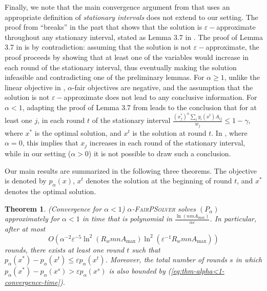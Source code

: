 \documentclass[11pt]{article}
\makeatletter
\newcommand{\wratio}{R_w}
\newtheorem{theorem}{Theorem}[section]
\renewcommand{\paragraph}{\@startsection{paragraph}{4}{\z@}{1ex \@plus 1ex \@minus .2ex}{-.5em}{\normalfont\normalsize\bfseries}}
\makeatother
\begin{document}
{Finally, we note that the main convergence argument from \cite{AwerbuchKhandekar2009} that uses an appropriate definition of \emph{stationary intervals} does not extend to our setting. The proof from \cite{AwerbuchKhandekar2009} ``breaks'' in the part that shows that the solution is $\varepsilon-$approximate throughout any stationary interval, stated as Lemma 3.7 in \cite{AwerbuchKhandekar2009}. The proof of Lemma 3.7 in \cite{AwerbuchKhandekar2009} is by contradiction: assuming that the solution is not $\varepsilon-$approximate, the proof proceeds by showing that at least one of the variables would increase in each round of the stationary interval, thus eventually making the solution infeasible and contradicting one of the preliminary lemmas. For $\alpha\geq 1$, unlike the linear objective in \cite{AwerbuchKhandekar2009}, $\alpha$-fair objectives are negative, and the assumption that the solution is not $\varepsilon-$approximate does not lead to any conclusive information. For $\alpha<1$, adapting the proof of Lemma 3.7 from \cite{AwerbuchKhandekar2009} leads to the conclusion that for at least one $j$, in each round $t$ of the stationary interval $\frac{{(x_j^*)}^{\alpha}\sum_i y_i(x^t)A_{ij}}{w_j}\leq 1-\gamma$, where $x^*$ is the optimal solution, and $x^t$ is the solution at round $t$. In \cite{AwerbuchKhandekar2009}, where $\alpha=0$, this implies that $x_j$ increases in each round of the stationary interval, while in our setting ($\alpha>0$) it is not possible to draw such a conclusion. }

\paragraph{Main Results.}

Our main results are summarized in the following three theorems. 
The objective is denoted by $p_\alpha(x)$, $x^t$ denotes the solution at the beginning of round $t$, and $x^*$ denotes the optimal solution.

\begin{theorem}\label{thm:convergence-alpha<1}
(Convergence for $\alpha < 1$) \textsc{$\alpha$-FairPSolver} solves $(P_\alpha)$ approximately for $\alpha < 1$ in time that is polynomial in $\frac{\ln(nmA_{\max})}{\alpha\varepsilon}$. In particular, after at most
\begin{equation}
O\left(\alpha^{-2}\varepsilon^{-5}\ln^2\left(\wratio mnA_{\max}\right)\ln^2\left(\varepsilon^{-1} \wratio mnA_{\max}\right)\right)
\label{eq:thm-alpha<1-convergence-time}
\end{equation}
rounds, there exists at least one round $t$ such that $p_\alpha(x^*) - p_\alpha(x^t)\leq \varepsilon p_\alpha(x^t)$. Moreover, the total number of rounds $s$ in which $p_\alpha(x^*) - p_\alpha(x^s)> \varepsilon p_\alpha(x^s)$ is also bounded by (\ref{eq:thm-alpha<1-convergence-time}).
\end{theorem}
\end{document}
